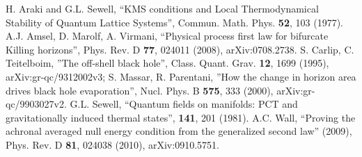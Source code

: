 \documentclass[12pt]{article}
\begin{document}
\begin{thebibliography}{99}
H. Araki and G.L. Sewell, ``KMS conditions and Local Thermodynamical Stability of Quantum Lattice Systems'', Commun. Math. Phys. \textbf{52}, 103 (1977).
A.J. Amsel, D. Marolf, A. Virmani, ``Physical process first law for bifurcate Killing horizons'', Phys. Rev. D \textbf{77}, 024011 (2008), arXiv:0708.2738.
S. Carlip, C. Teitelboim, ''The off-shell black hole'', Class. Quant. Grav. \textbf{12}, 1699 (1995), arXiv:gr-qc/9312002v3; S. Massar, R. Parentani, ''How the change in horizon area drives black hole evaporation'', Nucl. Phys. B \textbf{575}, 333 (2000), arXiv:gr-qc/9903027v2.
G.L. Sewell, ``Quantum fields on manifolds: PCT and gravitationally induced thermal states'', \textbf{141}, 201 (1981).
A.C. Wall, ``Proving the achronal averaged null energy condition from the generalized second law'' (2009), Phys. Rev. D \textbf{81}, 024038 (2010), arXiv:0910.5751. 
\end{thebibliography}
\end{document}
